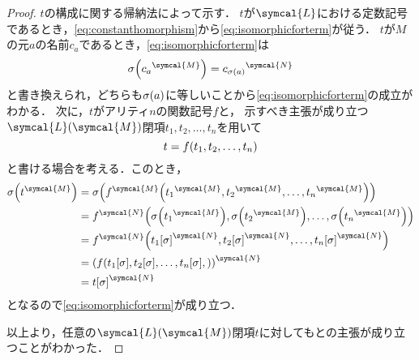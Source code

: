 \begin{proof}
	\(t\)の構成に関する帰納法によって示す．
	\(t\)が\(\symcal{L}\)における定数記号であるとき，\cref{eq:constanthomorphism}から\cref{eq:isomorphicforterm}が従う．
	\(t\)が\(M\)の元\(a\)の名前\(c_a\)であるとき，\cref{eq:isomorphicforterm}は
	\[
		\apply{\sigma}{\interpretation{\symcal{M}}{c_a}} = \interpretation{\symcal{N}}{c_{\apply{\sigma}{a}}}
	\]
	と書き換えられ，どちらも\(\apply{\sigma}{a}\)に等しいことから\cref{eq:isomorphicforterm}の成立がわかる．
	次に，\(t\)がアリティ\(n\)の関数記号\(f\)と，
	示すべき主張が成り立つ\(\languagewithname{\symcal{L}}{\symcal{M}}\)閉項\(t_1, t_2, \dots, t_n\)を用いて
	\[
		t = \apply{f}{t_1, t_2, \dots, t_n}
	\]
	と書ける場合を考える．このとき，
	\begin{align*}
		\apply{\sigma}{
			\interpretation{\symcal{M}}{t}
		}
		 & =
		\apply{\sigma}{
			\apply{\interpretation{\symcal{M}}{f}}{
				\interpretation{\symcal{M}}{t_1},
				\interpretation{\symcal{M}}{t_2},
				\dots,
				\interpretation{\symcal{M}}{t_n}
			}
		}    \\
		 & =
		\apply{\interpretation{\symcal{N}}{f}}{
			\apply{\sigma}{\interpretation{\symcal{M}}{t_1}},
			\apply{\sigma}{\interpretation{\symcal{M}}{t_2}},
			\dots,
			\apply{\sigma}{\interpretation{\symcal{M}}{t_n}}
		}    \\
		 & =
		\apply{\interpretation{\symcal{N}}{f}}{
			\interpretation{\symcal{N}}{\subst{t_1}{\sigma}},
			\interpretation{\symcal{N}}{\subst{t_2}{\sigma}},
			\dots,
			\interpretation{\symcal{N}}{\subst{t_n}{\sigma}}
		}    \\
		 & =
		\interpretation{\symcal{N}}{\paren{\apply{f}{
					\subst{t_1}{\sigma},
					\subst{t_2}{\sigma},
					\dots,
					\subst{t_n}{\sigma},
		}}}  \\
		 & =
		\interpretation{\symcal{N}}{\subst{t}{\sigma}}
	\end{align*}
	となるので\cref{eq:isomorphicforterm}が成り立つ．

	以上より，任意の\(\languagewithname{\symcal{L}}{\symcal{M}}\)閉項\(t\)に対してもとの主張が成り立つことがわかった．
\end{proof}


